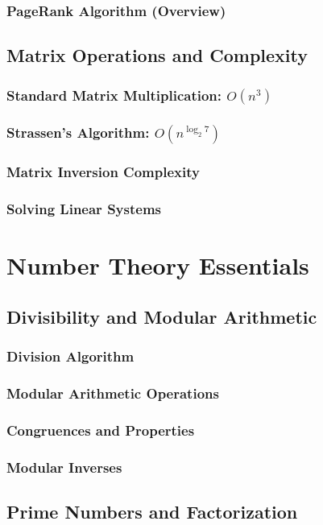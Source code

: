 \subsubsection{PageRank Algorithm (Overview)}

\subsection{Matrix Operations and Complexity}
\subsubsection{Standard Matrix Multiplication: $O(n^3)$}
\subsubsection{Strassen's Algorithm: $O(n^{\log_2 7})$}
\subsubsection{Matrix Inversion Complexity}
\subsubsection{Solving Linear Systems}

\section{Number Theory Essentials}
\subsection{Divisibility and Modular Arithmetic}
\subsubsection{Division Algorithm}
\subsubsection{Modular Arithmetic Operations}
\subsubsection{Congruences and Properties}
\subsubsection{Modular Inverses}

\subsection{Prime Numbers and Factorization}
